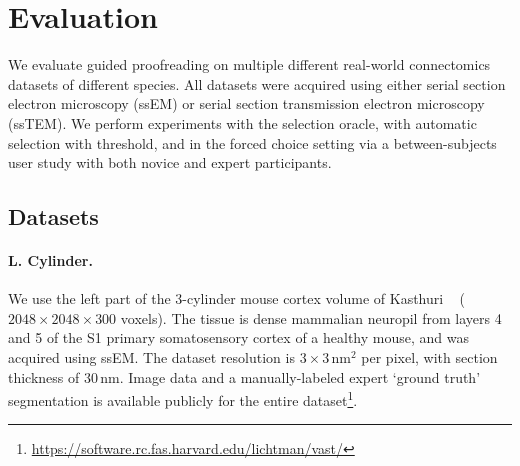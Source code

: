 
\section{Evaluation}
\label{sec:evaluation}

We evaluate guided proofreading on multiple different real-world connectomics datasets of different species. All datasets were acquired using either serial section electron microscopy (ssEM) or serial section transmission electron microscopy (ssTEM). We perform experiments with the selection oracle, with automatic selection with threshold, and in the forced choice setting via a between-subjects user study with both novice and expert participants.

\subsection{Datasets}

\paragraph{L. Cylinder.} We use the left part of the 3-cylinder mouse cortex volume of Kasthuri \etal~\cite{kasthuri2015saturated} ($2048\times2048\times300$ voxels). The tissue is dense mammalian neuropil from layers 4 and 5 of the S1 primary somatosensory cortex of a healthy mouse, and was acquired using ssEM. The dataset resolution is $3\times3\, \text{nm}^2$ per pixel, with section thickness of $30\, \text{nm}$. Image data and a manually-labeled expert `ground truth' segmentation is available publicly for the entire dataset\footnote{\scriptsize{\url{https://software.rc.fas.harvard.edu/lichtman/vast/}}}.


